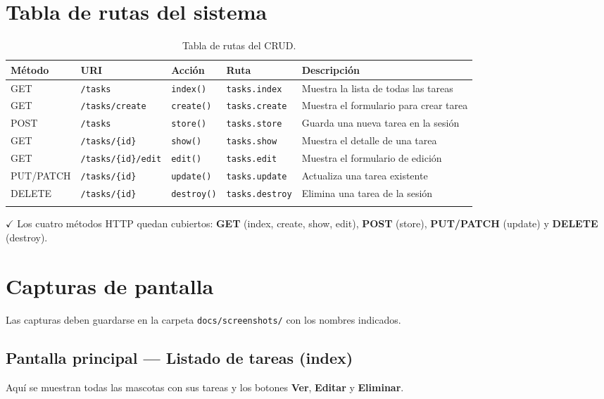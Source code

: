 \documentclass[11pt,a4paper]{article}
\begin{document}
\section{Tabla de rutas del sistema}

\begin{longtable}{|p{2cm}|p{2.8cm}|p{2.8cm}|p{2.5cm}|p{4.5cm}|}
\hline
\textbf{Método} & \textbf{URI} & \textbf{Acción} & \textbf{Ruta} & \textbf{Descripción} \\ \hline
\endhead
GET     & \texttt{/tasks}              & \texttt{index()}   & \texttt{tasks.index}   & Muestra la lista de todas las tareas \\ \hline
GET     & \texttt{/tasks/create}       & \texttt{create()}  & \texttt{tasks.create}  & Muestra el formulario para crear tarea \\ \hline
POST    & \texttt{/tasks}              & \texttt{store()}   & \texttt{tasks.store}   & Guarda una nueva tarea en la sesión \\ \hline
GET     & \texttt{/tasks/\{id\}}         & \texttt{show()}    & \texttt{tasks.show}    & Muestra el detalle de una tarea \\ \hline
GET     & \texttt{/tasks/\{id\}/edit}    & \texttt{edit()}    & \texttt{tasks.edit}    & Muestra el formulario de edición \\ \hline
PUT/PATCH & \texttt{/tasks/\{id\}}       & \texttt{update()}  & \texttt{tasks.update}  & Actualiza una tarea existente \\ \hline
DELETE  & \texttt{/tasks/\{id\}}         & \texttt{destroy()} & \texttt{tasks.destroy} & Elimina una tarea de la sesión \\ \hline
\caption{Tabla de rutas del CRUD.}
\end{longtable}

\noindent\textcolor{primary}{$\checkmark$} Los cuatro métodos HTTP quedan cubiertos: \textbf{GET} (index, create, show, edit), \textbf{POST} (store), \textbf{PUT/PATCH} (update) y \textbf{DELETE} (destroy).

\section{Capturas de pantalla}

Las capturas deben guardarse en la carpeta \texttt{docs/screenshots/} con los nombres indicados.

\subsection{Pantalla principal --- Listado de tareas (index)}
Aquí se muestran todas las mascotas con sus tareas y los botones \textbf{Ver}, \textbf{Editar} y \textbf{Eliminar}.
\end{document}
